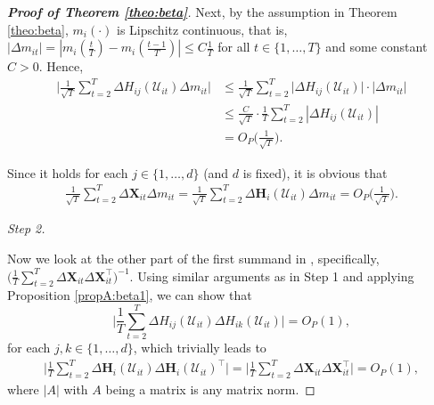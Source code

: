 \documentclass[a4paper,12pt]{article}
\makeatletter
\renewcommand{\eqref}[1]{\tagform@{\ref{#1}}}
\makeatother
\begin{document}
\begin{proof}[\textnormal{\textbf{Proof of Theorem \ref{theo:beta}}}]
Next, by the assumption in Theorem \ref{theo:beta}, $m_i(\cdot)$ is Lipschitz continuous, that is,  \linebreak $|\Delta m_{it}| = \left|m_i \left( \frac{t}{T} \right) - m_i \left(\frac{t-1}{T}\right) \right| \leq C \frac{1}{T}$ for all $t \in \{1, \ldots, T\}$ and some constant $C > 0$. Hence, 
\begin{align*}
\Big| \frac{1}{\sqrt{T}}\sum_{t=2}^T \Delta  H_{ij} (\mathcal{U}_{it})\Delta m_{it}\Big| &\leq \frac{1}{\sqrt{T}}\sum_{t=2}^T \big|\Delta  H_{ij} (\mathcal{U}_{it})\big| \cdot \big| \Delta m_{it} \big| \\
	& \leq \frac{C}{\sqrt{T}} \cdot \frac{1}{T} \sum_{t=2}^T \left|\Delta  H_{ij} (\mathcal{U}_{it})\right|\\
& = O_P\Big(\frac{1}{\sqrt{T}}\Big).
\end{align*}

Since it holds for each $j\in\{1, \ldots, d\}$ (and $d$ is fixed), it is obvious that
\begin{align}\label{theo-regs-proof-6}
\frac{1}{\sqrt{T}}\sum_{t=2}^T \Delta \mathbf{X}_{it} \Delta m_{it}  =\frac{1}{\sqrt{T}}\sum_{t=2}^T \Delta  \mathbf{H}_i (\mathcal{U}_{it})\Delta m_{it}= O_P\Big(\frac{1}{\sqrt{T}}\Big).
\end{align}

{\it Step 2.}

Now we look at the other part of the first summand in \eqref{theo:beta:proof1}, specifically, \linebreak $ \big(\frac{1}{T}\sum_{t=2}^T\Delta \mathbf{X}_{it} \Delta \mathbf{X}_{it}^\top\big)^{-1}$. Using similar arguments as in Step 1 and applying Proposition \ref{propA:beta1}, we can show that 
\[  \Big|\frac{1}{T}\sum_{t=2}^T \Delta H_{ij}(\mathcal{U}_{it}) \Delta H_{ik}(\mathcal{U}_{it})\Big| = O_P(1),
\]
for each $j, k\in\{1, \ldots, d\}$, which trivially leads to 
\begin{align*}
\Big| \frac{1}{T}\sum_{t=2}^T \Delta \mathbf{H}_i (\mathcal{U}_{it})\Delta \mathbf{H}_i (\mathcal{U}_{it})^\top \Big| =\Big|\frac{1}{T}\sum_{t=2}^T\Delta \mathbf{X}_{it} \Delta \mathbf{X}_{it}^\top\Big| = O_P(1),
\end{align*}
where $|A|$ with $A$ being a matrix is any matrix norm.


\end{proof}
\end{document}
